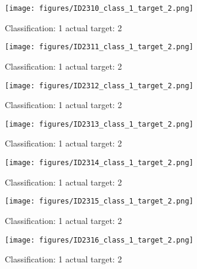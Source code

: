 \begin{figure}[h!]
\begin{center}
\texttt{[image: figures/ID2310\_class\_1\_target\_2.png]}
\end{center}
\caption{ Classification: 1 actual target: 2}
\label{fig:ID2310_class_1_target_2}
\end{figure}
\begin{figure}[h!]
\begin{center}
\texttt{[image: figures/ID2311\_class\_1\_target\_2.png]}
\end{center}
\caption{ Classification: 1 actual target: 2}
\label{fig:ID2311_class_1_target_2}
\end{figure}
\begin{figure}[h!]
\begin{center}
\texttt{[image: figures/ID2312\_class\_1\_target\_2.png]}
\end{center}
\caption{ Classification: 1 actual target: 2}
\label{fig:ID2312_class_1_target_2}
\end{figure}
\begin{figure}[h!]
\begin{center}
\texttt{[image: figures/ID2313\_class\_1\_target\_2.png]}
\end{center}
\caption{ Classification: 1 actual target: 2}
\label{fig:ID2313_class_1_target_2}
\end{figure}
\begin{figure}[h!]
\begin{center}
\texttt{[image: figures/ID2314\_class\_1\_target\_2.png]}
\end{center}
\caption{ Classification: 1 actual target: 2}
\label{fig:ID2314_class_1_target_2}
\end{figure}
\begin{figure}[h!]
\begin{center}
\texttt{[image: figures/ID2315\_class\_1\_target\_2.png]}
\end{center}
\caption{ Classification: 1 actual target: 2}
\label{fig:ID2315_class_1_target_2}
\end{figure}
\begin{figure}[h!]
\begin{center}
\texttt{[image: figures/ID2316\_class\_1\_target\_2.png]}
\end{center}
\caption{ Classification: 1 actual target: 2}
\label{fig:ID2316_class_1_target_2}
\end{figure}
